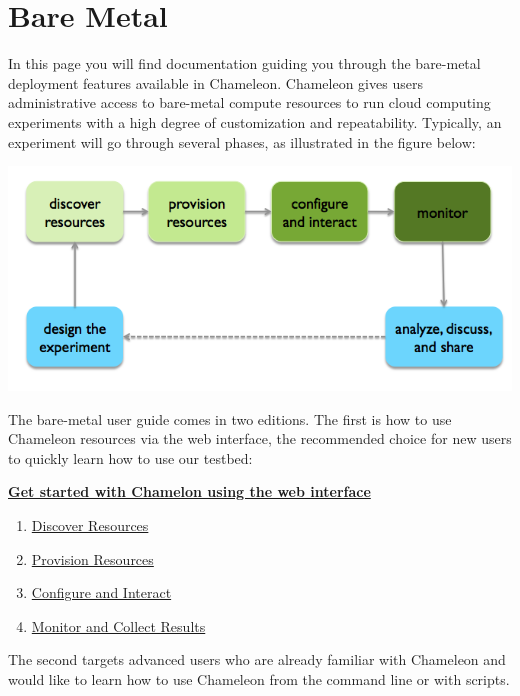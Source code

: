 \FILENAME

\section{Bare Metal}\label{C:cc-baremetal}

In this page you will find documentation guiding you through the
bare-metal deployment features available in Chameleon. Chameleon gives
users administrative access to bare-metal compute resources to
run cloud computing experiments with a high degree of customization
and repeatability. Typically, an experiment will go through several
phases, as illustrated in the figure below:


\includegraphics[width=\columnwidth]{images/chameleon/baremetal.png}


The bare-metal user guide comes in two editions. The first is how to use
Chameleon resources via the web interface, the recommended choice for
new users to quickly learn how to use our testbed:

\textbf{\href{https://www.chameleoncloud.org/discover-resources}{Get
started with Chamelon using the web interface}}

\begin{enumerate}
\item
  \href{https://www.chameleoncloud.org/discover-resources/}{Discover
  Resources}
\item
  \href{https://www.chameleoncloud.org/provision-resources/}{Provision
  Resources} 
\item
  \href{https://www.chameleoncloud.org/configure-and-interact/}{Configure
  and Interact}
\item
  \href{https://www.chameleoncloud.org/monitor-and-collect/}{Monitor and
  Collect Results}
\end{enumerate}

The second targets advanced users who are already familiar with
Chameleon and would like to learn how to use Chameleon from the command
line or with scripts.


